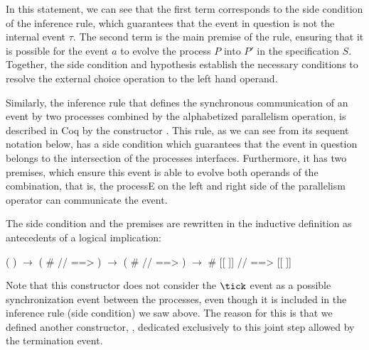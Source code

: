 In this statement, we can see that the first term corresponds to the side condition of the inference rule, which guarantees that the event in question is not the internal event $ \tau $. The second term is the main premise of the rule, ensuring that it is possible for the event $ a $ to evolve the process $ P $ into $ P' $ in the specification $ S $. Together, the side condition and hypothesis establish the necessary conditions to resolve the external choice operation to the left hand operand.

Similarly, the inference rule that defines the synchronous communication of an event by two processes combined by the alphabetized parallelism operation, is described in Coq by the constructor . This rule, as we can see from its sequent notation below, has a side condition which guarantees that the event in question belongs to the intersection of the processes interfaces. Furthermore, it has two premises, which ensure this event is able to evolve both operands of the combination, that is, the processE  on the left and right side of the parallelism operator can communicate the event.

\begin{prooftree}
\end{prooftree}

The side condition and the premises are rewritten in the inductive definition as antecedents of a logical implication:

\begin{coqdoccode}
	\coqdocnoindent
	  (   ) \ensuremath{\rightarrow}\coqdoceol
	\coqdocindent{1.00em}
	( \#  //   ==> ) \ensuremath{\rightarrow}\coqdoceol
	\coqdocindent{1.00em}
	( \#  //   ==> ) \ensuremath{\rightarrow}\coqdoceol
	\coqdocindent{1.00em}
	 \#  [[    ]]  //   ==>  [[    ]] \coqdoceol
\end{coqdoccode}

Note that this constructor does not consider the $ \tick $ event as a possible synchronization event between the processes, even though it is included in the inference rule (side condition) we saw above. The reason for this is that we defined another constructor, , dedicated exclusively to this joint step allowed by the termination event.

